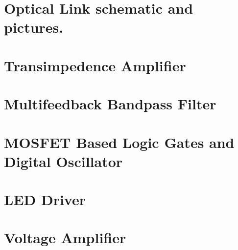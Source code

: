 \documentclass{article}
\begin{document}
\begin{appendices}
	
	
\section{Optical Link schematic and pictures.}



\section{Transimpedence Amplifier}
	

\section{Multifeedback Bandpass Filter}
	

\section{MOSFET Based Logic Gates and Digital Oscillator}


\section{LED Driver}
	

\section{Voltage Amplifier}
		



\end{appendices}
\end{document}
